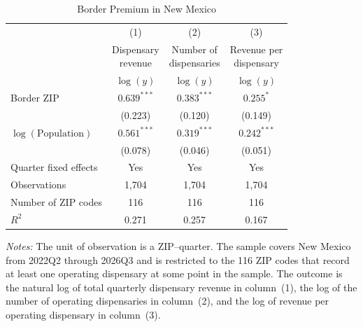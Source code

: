 
\begin{table}[htbp]
\centering
\caption{Border Premium in New Mexico}
\label{tab:nm_baseline}

\begin{tabular*}{\textwidth}{@{\extracolsep{\fill}}lccc}
\toprule
& (1) & (2) & (3) \\
& \shortstack{Dispensary\\revenue}
& \shortstack{Number of\\dispensaries}
& \shortstack{Revenue per\\dispensary} \\
& $\log(y)$
& $\log(y)$
& $\log(y)$ \\
\midrule

Border ZIP
    & $0.639^{***}$
    & $0.383^{***}$
    & $0.255^{*}$ \\
    & (0.223)
    & (0.120)
    & (0.149) \\

\addlinespace

$\log(\text{Population})$
    & $0.561^{***}$
    & $0.319^{***}$
    & $0.242^{***}$ \\
    & (0.078)
    & (0.046)
    & (0.051) \\

\midrule

Quarter fixed effects
    & Yes & Yes & Yes \\

Observations
    & 1,704
    & 1,704
    & 1,704 \\

Number of ZIP codes
    & 116
    & 116
    & 116 \\

$R^{2}$
    & 0.271
    & 0.257
    & 0.167 \\

\bottomrule
\end{tabular*}

\begin{minipage}{\textwidth}
\vspace{0.4em}
\fontsize{9pt}{9pt}\selectfont

\textit{Notes:}
The unit of observation is a ZIP--quarter. The sample covers New Mexico from
2022Q2 through 2026Q3 and is restricted to the 116 ZIP codes that record at
least one operating dispensary at some point in the sample. The outcome is the
natural log of total quarterly dispensary revenue in column~(1), the log of the
number of operating dispensaries in column~(2), and the log of revenue per
operating dispensary in column~(3).


\end{minipage}
\end{table}
